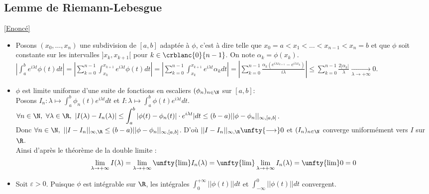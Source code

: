 \documentclass{book}
\begin{document}
	\subsection{Lemme de Riemann-Lebesgue }
	\label{sec:lemme-de-riemann-lebesgue-etoile3}
	\textcolor{blue}{\hyperref[Lemme de Riemann-Lebesgue]{[Enoncé]}}\\
	\begin{itemize}[leftmargin=*]
		\item Posons $(x_0,\dots,x_n)$ une subdivision de $[a,b]$ adaptée à $\phi$, c'est à dire telle que $x_0=a<x_1<\dots<x_{n-1}<x_n=b$ et que $\phi$ soit constante sur les intervalles $]x_k,x_{k+1}[$ pour $k\in \crblanc{0}{n-1}$. On note $\alpha_k=\phi(x_k)$.\\
		$\left|\displaystyle\int_a^b e^{i\lambda t}\phi(t)dt\right|=\left|\displaystyle\sum\limits_{k=0}^{n-1}\int_{x_k}^{x_{k+1}}e^{i\lambda t}\phi(t)dt\right|=\left|\displaystyle\sum\limits_{k=0}^{n-1}\int_{x_k}^{x_{k+1}}e^{i\lambda t}\alpha_kdt\right|=\left|\displaystyle\sum\limits_{k=0}^{n-1}\frac{\alpha_k(e^{i\lambda x_{k+1}}-e^{i\lambda x_k})}{i\lambda}\right|\leq\displaystyle\sum\limits_{k=0}^{n-1}\frac{2|\alpha_k|}{\lambda}\underset{\lambda\to +\infty}{\longrightarrow}0$.\\
		\item $\phi$ est limite uniforme d'une suite de fonctions en escaliers $(\phi_n)_{n\in \N}$ sur $[a,b]$:\\
		Posons $I_n:\lambda\mapsto \displaystyle\int_a^b\phi_n(t)e^{i\lambda t}dt$ et $I:\lambda\mapsto \displaystyle\int_a^b\phi(t)e^{i\lambda t}dt$.\\ $\forall n\in \N,\ \forall \lambda\in \R,\ |I(\lambda)-I_n(\lambda)|\leq\displaystyle\int_a^b|\phi(t)-\phi_n(t)|\cdot e^{i\lambda t}|dt\leq (b-a)||\phi-\phi_n||_{\infty,[a,b]}$.\\
		Donc $\forall n\in \N,\ ||I-I_n||_{\infty,\R}\leq (b-a)||\phi-\phi_n||_{\infty,[a,b]}$. D'où $||I-I_n||_{\infty,\R}\unfty{\longrightarrow}0$ et $(I_n)_{n\in \N}$ converge uniformément vers $I$ sur $\R$.\\
		Ainsi d'après le théorème de la double limite :\\
		$$\lim\limits_{\lambda\to +\infty}I(\lambda)=\lim\limits_{\lambda\to +\infty}\unfty{\lim}I_n(\lambda)=\unfty{\lim}\lim\limits_{\lambda\to +\infty}I_n(\lambda)=\unfty{\lim}0=0$$
		\item Soit $\varepsilon>0$. Puisque $\phi$ est intégrable sur $\R$, les intégrales $\displaystyle\int_0^{+\infty}||\phi(t)||dt$ et $\displaystyle\int_{-\infty}^0||\phi(t)||dt$ convergent.\\

\end{itemize}
\end{document}

